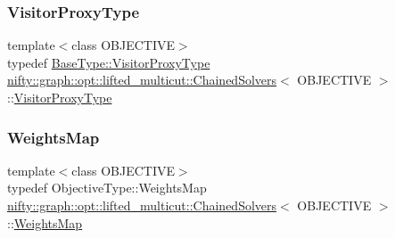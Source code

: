 \mbox{\label{classnifty_1_1graph_1_1opt_1_1lifted__multicut_1_1ChainedSolvers_ae5ecbe72a3e03999eb316cc0e70e5e6d}} 
\subsubsection{\texorpdfstring{Visitor\+Proxy\+Type}{VisitorProxyType}}
{\footnotesize\ttfamily template$<$class O\+B\+J\+E\+C\+T\+I\+VE$>$ \\
typedef \hyperlink{classnifty_1_1graph_1_1opt_1_1common_1_1SolverBase_ad209b469b3bc9fc0fc14e9fed4d09075}{Base\+Type\+::\+Visitor\+Proxy\+Type} \hyperlink{classnifty_1_1graph_1_1opt_1_1lifted__multicut_1_1ChainedSolvers}{nifty\+::graph\+::opt\+::lifted\+\_\+multicut\+::\+Chained\+Solvers}$<$ O\+B\+J\+E\+C\+T\+I\+VE $>$\+::\hyperlink{classnifty_1_1graph_1_1opt_1_1lifted__multicut_1_1ChainedSolvers_ae5ecbe72a3e03999eb316cc0e70e5e6d}{Visitor\+Proxy\+Type}}

\mbox{\label{classnifty_1_1graph_1_1opt_1_1lifted__multicut_1_1ChainedSolvers_a0d2c7fee00b27707b157f2cde2be12fb}} 
\subsubsection{\texorpdfstring{Weights\+Map}{WeightsMap}}
{\footnotesize\ttfamily template$<$class O\+B\+J\+E\+C\+T\+I\+VE$>$ \\
typedef Objective\+Type\+::\+Weights\+Map \hyperlink{classnifty_1_1graph_1_1opt_1_1lifted__multicut_1_1ChainedSolvers}{nifty\+::graph\+::opt\+::lifted\+\_\+multicut\+::\+Chained\+Solvers}$<$ O\+B\+J\+E\+C\+T\+I\+VE $>$\+::\hyperlink{classnifty_1_1graph_1_1opt_1_1lifted__multicut_1_1ChainedSolvers_a0d2c7fee00b27707b157f2cde2be12fb}{Weights\+Map}}

